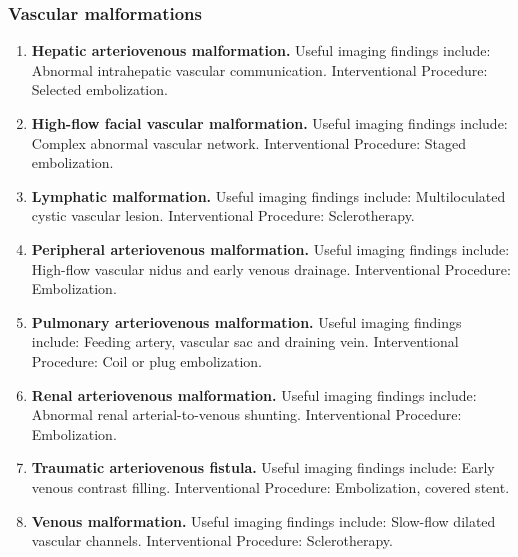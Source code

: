 \subsubsection{Vascular malformations}
\begin{enumerate}[leftmargin=*,itemsep=0.45em,topsep=0.4em]
\item \textbf{Hepatic arteriovenous malformation.} Useful imaging findings include: Abnormal intrahepatic vascular communication. Interventional Procedure: Selected embolization.
\item \textbf{High-flow facial vascular malformation.} Useful imaging findings include: Complex abnormal vascular network. Interventional Procedure: Staged embolization.
\item \textbf{Lymphatic malformation.} Useful imaging findings include: Multiloculated cystic vascular lesion. Interventional Procedure: Sclerotherapy.
\item \textbf{Peripheral arteriovenous malformation.} Useful imaging findings include: High-flow vascular nidus and early venous drainage. Interventional Procedure: Embolization.
\item \textbf{Pulmonary arteriovenous malformation.} Useful imaging findings include: Feeding artery, vascular sac and draining vein. Interventional Procedure: Coil or plug embolization.
\item \textbf{Renal arteriovenous malformation.} Useful imaging findings include: Abnormal renal arterial-to-venous shunting. Interventional Procedure: Embolization.
\item \textbf{Traumatic arteriovenous fistula.} Useful imaging findings include: Early venous contrast filling. Interventional Procedure: Embolization, covered stent.
\item \textbf{Venous malformation.} Useful imaging findings include: Slow-flow dilated vascular channels. Interventional Procedure: Sclerotherapy.
\end{enumerate}

